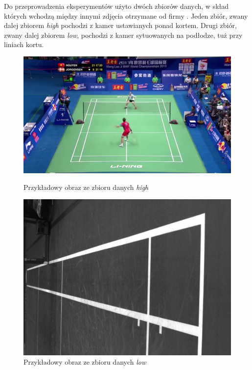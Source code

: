 
Do przeprowadzenia eksperymentów użyto dwóch zbiorów danych, w skład których wchodzą między innymi zdjęcia otrzymane od firmy \blue.
Jeden zbiór, zwany dalej zbiorem \textit{high} pochodzi z kamer ustawianych ponad kortem.
Drugi zbiór, zwany dalej zbiorem \textit{low}, pochodzi z kamer sytuowanych na podłodze, tuż przy liniach kortu.


\begin{figure}[!htb]
    \includegraphics[width=\linewidth]{../../badminton/datasets/high/split/test_court2-00002.png}
    \caption{Przykładowy obraz ze zbioru danych \textit{high}}
  \endminipage\hfill
    \includegraphics[width=\linewidth]{../../badminton/datasets/low/split/1564909032792410075.jpg}
    \caption{Przykładowy obraz ze zbioru danych \textit{low}}
  \endminipage\hfill
\end{figure}


